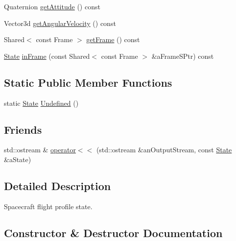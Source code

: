 \begin{DoxyCompactItemize}
\item 
Quaternion \hyperlink{classlibrary_1_1astro_1_1flight_1_1profile_1_1_state_a473831938892a97366ed5fb24b51e7be}{get\+Attitude} () const
\item 
Vector3d \hyperlink{classlibrary_1_1astro_1_1flight_1_1profile_1_1_state_ab228ee5983e7d1c1f93e534013f87b7d}{get\+Angular\+Velocity} () const
\item 
Shared$<$ const Frame $>$ \hyperlink{classlibrary_1_1astro_1_1flight_1_1profile_1_1_state_aa0de9fc4cfaf54134230e5e99f276fb4}{get\+Frame} () const
\item 
\hyperlink{classlibrary_1_1astro_1_1flight_1_1profile_1_1_state}{State} \hyperlink{classlibrary_1_1astro_1_1flight_1_1profile_1_1_state_a29ebd3fb92ad525b65782a904713b8ff}{in\+Frame} (const Shared$<$ const Frame $>$ \&a\+Frame\+S\+Ptr) const
\end{DoxyCompactItemize}
\subsection*{Static Public Member Functions}
\begin{DoxyCompactItemize}
\item 
static \hyperlink{classlibrary_1_1astro_1_1flight_1_1profile_1_1_state}{State} \hyperlink{classlibrary_1_1astro_1_1flight_1_1profile_1_1_state_a1ad05946cb00b3b26fd7b56e8f8bfe94}{Undefined} ()
\end{DoxyCompactItemize}
\subsection*{Friends}
\begin{DoxyCompactItemize}
\item 
std\+::ostream \& \hyperlink{classlibrary_1_1astro_1_1flight_1_1profile_1_1_state_abba03f039f2534d691a1dc28426e8b89}{operator$<$$<$} (std\+::ostream \&an\+Output\+Stream, const \hyperlink{classlibrary_1_1astro_1_1flight_1_1profile_1_1_state}{State} \&a\+State)
\end{DoxyCompactItemize}


\subsection{Detailed Description}
Spacecraft flight profile state. 

\subsection{Constructor \& Destructor Documentation}
\mbox{\label{classlibrary_1_1astro_1_1flight_1_1profile_1_1_state_a254a001f4c2ddc33684dbfdd4ee07194}} 
